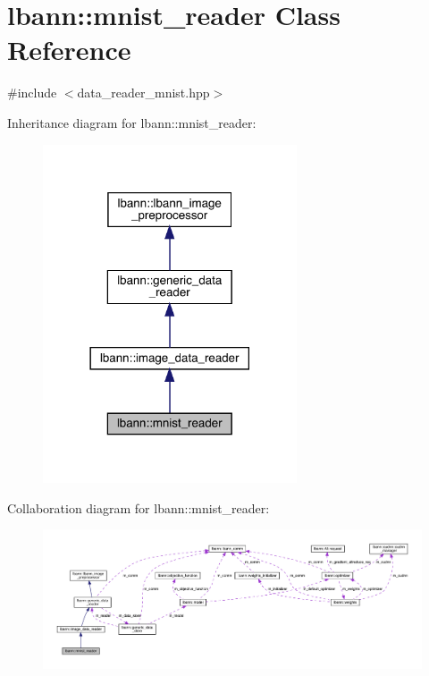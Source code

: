 \hypertarget{classlbann_1_1mnist__reader}{}\section{lbann\+:\+:mnist\+\_\+reader Class Reference}
\label{classlbann_1_1mnist__reader}


{\ttfamily \#include $<$data\+\_\+reader\+\_\+mnist.\+hpp$>$}



Inheritance diagram for lbann\+:\+:mnist\+\_\+reader\+:\nopagebreak
\begin{figure}[H]
\begin{center}
\leavevmode
\includegraphics[width=213pt]{classlbann_1_1mnist__reader__inherit__graph}
\end{center}
\end{figure}


Collaboration diagram for lbann\+:\+:mnist\+\_\+reader\+:\nopagebreak
\begin{figure}[H]
\begin{center}
\leavevmode
\includegraphics[width=350pt]{classlbann_1_1mnist__reader__coll__graph}
\end{center}
\end{figure}
